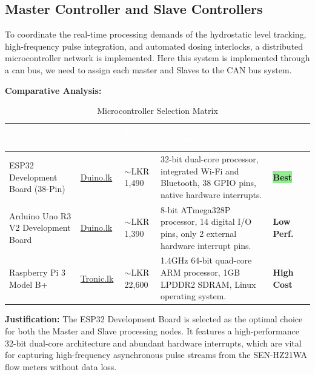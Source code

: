 \documentclass[12pt,a4paper]{article}
\newcommand{\badgegreen}[1]{%
  \colorbox{lightgreen}{\textcolor{badgegreen}{\footnotesize\textbf{#1}}}%
}
\newcommand{\badgeamber}[1]{%
  \colorbox{lightamber}{\textcolor{badgeamber}{\footnotesize\textbf{#1}}}%
}
\begin{document}
\subsection{Master Controller and Slave Controllers}

To coordinate the real-time processing demands of the hydrostatic level tracking, high-frequency pulse integration, and automated dosing interlocks, a distributed microcontroller network is implemented. Here this system is implemented through a can bus, we need to assign each master and Slaves to the CAN bus system.

\vspace{0.3cm}
\noindent\textbf{Comparative Analysis:}

\begin{table}[H]
\centering
\setlength{\tabcolsep}{5pt}
\renewcommand{\arraystretch}{1.4}
\begin{tabular}{|p{3.2cm}|p{3.5cm}|p{2.2cm}|p{3.5cm}|p{2cm}|}
\hline
\rowcolor{headerblue}
\textcolor{white}{\textbf{Product}} &
\textcolor{white}{\textbf{Supplier}} &
\textcolor{white}{\textbf{Est. Cost}} &
\textcolor{white}{\textbf{Key Specifications}} &
\textcolor{white}{\textbf{Verdict}} \\
\hline
\rowcolor{chosen}
ESP32 Development Board (38-Pin) &
\href{https://www.duino.lk/product/esp32-development-board-38-pin/}{Duino.lk} &
$\sim$LKR 1,490 &
32-bit dual-core processor, integrated Wi-Fi and Bluetooth, 38 GPIO pins, native hardware interrupts. &
\badgegreen{Best} \\
\hline
Arduino Uno R3 V2 Development Board &
\href{https://www.duino.lk/product/uno-r3v2-development-board-mega328p-16u2/}{Duino.lk} &
$\sim$LKR 1,390 &
8-bit ATmega328P processor, 14 digital I/O pins, only 2 external hardware interrupt pins. &
\badgeamber{Low Perf.} \\
\hline
Raspberry Pi 3 Model B+ &
\href{https://tronic.lk/product/raspberry-pi-3-model-b1}{Tronic.lk} &
$\sim$LKR 22,600 &
1.4GHz 64-bit quad-core ARM processor, 1GB LPDDR2 SDRAM, Linux operating system. &
\badgeamber{High Cost} \\
\hline
\end{tabular}
\caption{Microcontroller Selection Matrix}
\end{table}

\noindent\textbf{Justification:} The ESP32 Development Board is selected as the optimal choice for both the Master and Slave processing nodes. It features a high-performance 32-bit dual-core architecture and abundant hardware interrupts, which are vital for capturing high-frequency asynchronous pulse streams from the SEN-HZ21WA flow meters without data loss. 
\end{document}
